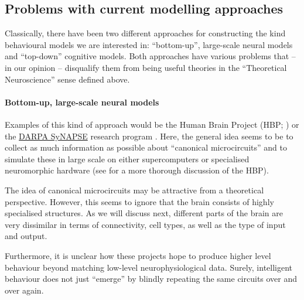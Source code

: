 \documentclass[10pt,letterpaper,oneside]{article}
\begin{document}

\subsection{Problems with current modelling approaches}

Classically, there have been two different approaches for constructing the kind behavioural models we are interested in: \enquote{bottom-up}, large-scale neural models and \enquote{top-down} cognitive models. Both approaches have various problems that -- in our opinion -- disqualify them from being useful theories in the \enquote{Theoretical Neuroscience} sense defined above.


\paragraph{Bottom-up, large-scale neural models}
Examples of this kind of approach would be the Human Brain Project (HBP; \cite{markram2012human}) or the \href{https://www.darpa.mil/program/systems-of-neuromorphic-adaptive-plastic-scalable-electronics}{DARPA SyNAPSE} research program \cite{morgan2011darpa,merolla2014million}. Here, the general idea seems to be to collect as much information as possible about \enquote{canonical microcircuits} and to simulate these in large scale on either supercomputers or specialised neuromorphic hardware (see \cite{komer2016unified} for a more thorough discussion of the HBP).

The idea of canonical microcircuits may be attractive from a theoretical perspective. However, this seems to ignore that the brain consists of highly specialised structures. As we will discuss next, different parts of the brain are very dissimilar in terms of connectivity, cell types, as well as the type of input and output.

Furthermore, it is unclear how these projects hope to produce higher level behaviour beyond matching low-level neurophysiological data. Surely, intelligent behaviour does not just \enquote{emerge} by blindly repeating the same circuits over and over again.
\end{document}
